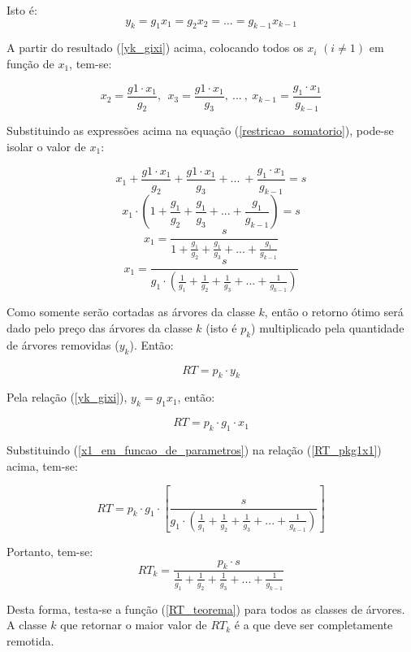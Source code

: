\documentclass[a4paper, 12pt]{article}
\begin{document}
Isto é: 
\begin{equation}\label{yk_gixi}
    y_k=g_1x_1=g_2x_2=...=g_{k-1}x_{k-1}
\end{equation}

A partir do resultado (\ref{yk_gixi}) acima, colocando todos os $x_i$ $(i \ne 1)$ em função de $x_1$, tem-se:

$$
x_2=\frac{g1\cdot x_1}{g_2}{,}\ \ x_3=\frac{g1\cdot x_1}{g_3}{,}\ ...\ {,}\ x_{k-1}=\frac{g_1\cdot x_1}{g_{k-1}}
$$

Substituindo as expressões acima na equação (\ref{restricao_somatorio}), pode-se isolar o valor de $x_1$:

$$
x_1+\frac{g1\cdot x_1}{g_2}+\frac{g1\cdot x_1}{g_3}+...\ +\frac{g_1\cdot x_1}{g_{k-1}}=s
$$
$$
x_1\cdot \left(1+\frac{g_1}{g_2}+\frac{g_1}{g_3}+...+\frac{g_1}{g_{k-1}}\right)=s
$$
$$
x_1=\frac{s}{1+\frac{g_1}{g_2}+\frac{g_1}{g_3}+...+\frac{g_1}{g_{k-1}}}
$$
\begin{equation}\label{x1_em_funcao_de_parametros}
    x_1=\frac{s}{g_1\cdot \left(\frac{1}{g_1}+\frac{1}{g_2}+\frac{1}{g_3}+...+\frac{1}{g_{k-1}}\right)}
\end{equation}

Como somente serão cortadas as árvores da classe $k$, então o retorno ótimo será dado pelo preço das árvores da classe $k$ (isto é $p_k$) multiplicado pela quantidade de árvores removidas ($y_k$). Então:

$$RT = p_k \cdot y_k$$

Pela relação (\ref{yk_gixi}), $y_k=g_1x_1$, então:

\begin{equation}\label{RT_pkg1x1}
    RT=p_k \cdot g_1 \cdot x_1
\end{equation}

Substituindo (\ref{x1_em_funcao_de_parametros}) na relação (\ref{RT_pkg1x1}) acima, tem-se:

$$
RT=p_k\cdot g_1\cdot \left[\frac{s}{g_1\cdot \left(\frac{1}{g_1}+\frac{1}{g_2}+\frac{1}{g_3}+...+\frac{1}{g_{k-1}}\right)}\right]
$$

Portanto, tem-se:
\begin{equation}\label{RT_teorema}
    RT_k=\frac{p_k\cdot s}{\frac{1}{g_1}+\frac{1}{g_2}+\frac{1}{g_3}+...+\frac{1}{g_{k-1}}}
\end{equation}

Desta forma, testa-se a função (\ref{RT_teorema}) para todos as classes de árvores. A classe $k$ que retornar o maior valor de $RT_k$ é a que deve ser completamente remotida.
\end{document}
